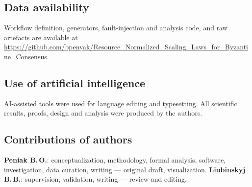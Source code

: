 \subsection*{Data availability}
Workflow definition, generators, fault-injection and analysis code, and raw
artefacts are available at
\url{https://github.com/bpenyak/Resource_Normalized_Scaling_Laws_for_Byzantine_Consensus}.

\subsection*{Use of artificial intelligence}
AI-assisted tools were used for language editing and typesetting. All
scientific results, proofs, design and analysis were produced by the authors.

\subsection*{Contributions of authors}
\textbf{Peniak B.\,O.}: conceptualization, methodology, formal analysis,
software, investigation, data curation, writing --- original draft,
visualization.
\textbf{Liubinskyj B.\,B.}: supervision, validation, writing --- review and
editing.
